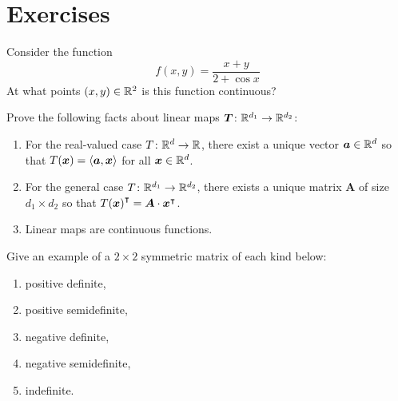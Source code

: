

\section*{Exercises}
\begin{problem}[Basic]
Consider the function
\begin{equation*}
f(x,y) = \dfrac{x+y}{2+\cos x}
\end{equation*}
At what points $(x,y) \in \mathbb{R}^2$ is this function continuous?
\end{problem}

\begin{problem}[Advanced]
Prove the following facts about linear maps $\boldsymbol{T} \colon \mathbb{R}^{d_1} \to \mathbb{R}^{d_2}$:
\begin{enumerate}
	\item For the real-valued case $T \colon \mathbb{R}^d \to \mathbb{R}$, there exist a unique vector $\boldsymbol{a} \in \mathbb{R}^d$ so that $T(\boldsymbol{x}) = \langle \boldsymbol{a}, \boldsymbol{x} \rangle$ for all $\boldsymbol{x} \in \mathbb{R}^d$.
	\item For the general case $T \colon \mathbb{R}^{d_1} \to \mathbb{R}^{d_2}$, there exists a unique matrix $\boldsymbol{A}$ of size $d_1 \times d_2$ so that ${T(\boldsymbol{x})}^\intercal = \boldsymbol{A} \cdot {\boldsymbol{x}}^\intercal$.
	\item Linear maps are continuous functions.
\end{enumerate}
\end{problem}

\begin{problem}[Intermediate]
Give an example of a $2 \times 2$ symmetric matrix of each kind below:
\begin{enumerate}
	\item positive definite, 
	\item positive semidefinite, 
	\item negative definite, 
	\item negative semidefinite,
	\item indefinite.
\end{enumerate}
\end{problem}

